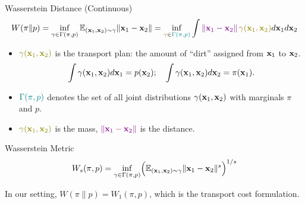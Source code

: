 \documentclass{beamer}
\begin{document}
\begin{frame}{Wasserstein Distance (Continuous)}
	\vspace{-0.5cm}
	{
	\small
	\[
		W(\pi \| p) = \inf_{\gamma \in \Gamma(\pi, p)} \bbE_{(\bx_1, \bx_2) \sim \gamma} \| \bx_1 - \bx_2 \| =  \inf_{{\color{olive}\gamma} \in {\color{teal}\Gamma(\pi, p)}} \int {\color{violet} \| \bx_1 - \bx_2 \|}\, {\color{olive}\gamma (\bx_1, \bx_2)} d \bx_1 d \bx_2
	\]
	}
	\vspace{-0.4cm}
	\begin{itemize}
		\item ${\color{olive}\gamma (\bx_1, \bx_2)}$ is the transport plan: the amount of “dirt” assigned from $\mathbf{x}_1$ to $\mathbf{x}_2$.
		\vspace{-0.2cm}
		\[
		\int \gamma(\mathbf{x}_1, \mathbf{x}_2) d \mathbf{x}_1 = p(\mathbf{x}_2); \quad \int \gamma(\mathbf{x}_1, \mathbf{x}_2) d \mathbf{x}_2 = \pi(\mathbf{x}_1).
		\]
		\vspace{-0.6cm}
		\item ${\color{teal}\Gamma(\pi, p)}$ denotes the set of all joint distributions $\gamma (\mathbf{x}_1, \mathbf{x}_2)$ with marginals $\pi$ and $p$.
		\item ${\color{olive}\gamma(\bx_1, \bx_2)}$ is the mass, ${\color{violet}\|\mathbf{x}_1 - \mathbf{x}_2\|}$ is the distance.
	\end{itemize}
	\eqpause
	\begin{block}{Wasserstein Metric}
		\vspace{-0.2cm}
		\[
		W_s(\pi, p) = \inf_{\gamma \in \Gamma(\pi, p)} \Bigl(\mathbb{E}_{(\mathbf{x}_1, \mathbf{x}_2) \sim \gamma} \|\mathbf{x}_1 - \mathbf{x}_2\|^s\Bigr)^{1/s}
		\]
		\vspace{-0.4cm}
	\end{block}
	In our setting, $W(\pi \| p) = W_1(\pi, p)$, which is the transport cost formulation.
\end{frame}
\end{document}
